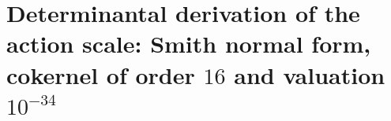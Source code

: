 \chapter{Determinantal derivation of the action scale: Smith normal form, cokernel of order \(16\) and valuation \(10^{-34}\)}
\label{chap:p3-final:34:escala_accion}

